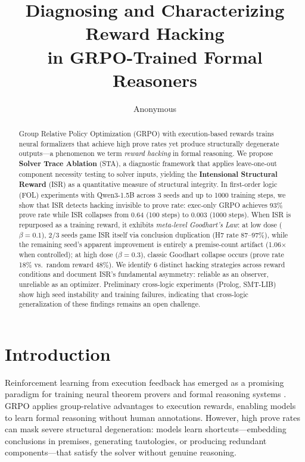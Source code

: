 \documentclass[11pt,a4paper]{article}
\title{Diagnosing and Characterizing Reward Hacking\\in GRPO-Trained Formal Reasoners}
\author{Anonymous}
\newcommand{\ISR}{\textsc{ISR}}
\newcommand{\STA}{\textsc{STA}}
\newcommand{\GRPO}{\textsc{GRPO}}
\begin{document}
\maketitle

\begin{abstract}
Group Relative Policy Optimization (\GRPO{}) with execution-based rewards trains neural formalizers that achieve high prove rates yet produce structurally degenerate outputs---a phenomenon we term \emph{reward hacking} in formal reasoning.
We propose \textbf{Solver Trace Ablation} (\STA{}), a diagnostic framework that applies leave-one-out component necessity testing to solver inputs, yielding the \textbf{Intensional Structural Reward} (\ISR{}) as a quantitative measure of structural integrity.
In first-order logic (FOL) experiments with Qwen3-1.5B across 3 seeds and up to 1000 training steps, we show that \ISR{} detects hacking invisible to prove rate: exec-only \GRPO{} achieves 93\% prove rate while \ISR{} collapses from 0.64 (100 steps) to 0.003 (1000 steps).
When \ISR{} is repurposed as a training reward, it exhibits \emph{meta-level Goodhart's Law}: at low dose ($\beta{=}0.1$), 2/3 seeds game \ISR{} itself via conclusion duplication (H7 rate 87--97\%), while the remaining seed's apparent improvement is entirely a premise-count artifact (1.06$\times$ when controlled); at high dose ($\beta{=}0.3$), classic Goodhart collapse occurs (prove rate 18\% vs.\ random reward 48\%).
We identify 6 distinct hacking strategies across reward conditions and document \ISR{}'s fundamental asymmetry: reliable as an observer, unreliable as an optimizer.
Preliminary cross-logic experiments (Prolog, SMT-LIB) show high seed instability and training failures, indicating that cross-logic generalization of these findings remains an open challenge.
\end{abstract}

\section{Introduction}

Reinforcement learning from execution feedback has emerged as a promising paradigm for training neural theorem provers and formal reasoning systems \cite{luo2024improve}.
\GRPO{} \cite{shao2024deepseekmath} applies group-relative advantages to execution rewards, enabling models to learn formal reasoning without human annotations.
However, high prove rates can mask severe structural degeneration: models learn shortcuts---embedding conclusions in premises, generating tautologies, or producing redundant components---that satisfy the solver without genuine reasoning.
\end{document}
